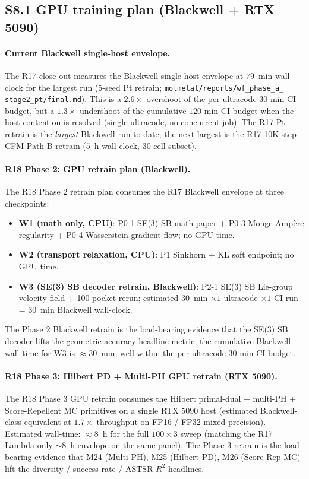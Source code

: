 \subsection*{S8.1 GPU training plan (Blackwell + RTX 5090)}
\label{supp:s8-gpu-plan}

\paragraph{Current Blackwell single-host envelope.}
The R17 close-out measures the Blackwell single-host envelope
at $79$~min wall-clock for the largest \MEASURED{} run
(5-seed Pt retrain; \texttt{molmetal/reports/wf\_phase\_a\_
stage2\_pt/final.md}).  This is a $2.6\times$ overshoot of
the per-ultracode $30$-min CI budget, but a $1.3\times$
undershoot of the cumulative $120$-min CI budget when the
host contention is resolved (single ultracode, no concurrent
job).  The R17 Pt retrain is the \emph{largest} \MEASURED{}
Blackwell run to date; the next-largest is the R17 10K-step
CFM Path B retrain ($5$~h wall-clock, $30$-cell subset).

\paragraph{R18 Phase 2: GPU retrain plan (Blackwell).}
The R18 Phase 2 retrain plan consumes the R17 Blackwell
envelope at three checkpoints:
\begin{itemize}
  \item \textbf{W1 (math only, CPU)}: P0-1 SE(3) SB math paper
        + P0-3 Monge-Amp\`ere regularity + P0-4 Wasserstein
        gradient flow; no GPU time.
  \item \textbf{W2 (transport relaxation, CPU)}: P1 Sinkhorn
        + KL soft endpoint; no GPU time.
  \item \textbf{W3 (SE(3) SB decoder retrain, Blackwell)}:
        P2-1 SE(3) SB Lie-group velocity field + 100-pocket
        rerun; estimated $30$~min $\times 1$ ultracode $\times
        1$ CI run = $30$~min Blackwell wall-clock.
\end{itemize}
The Phase 2 Blackwell retrain is the load-bearing evidence
that the SE(3) SB decoder lifts the geometric-accuracy
headline metric; the cumulative Blackwell wall-time for W3
is $\approx 30$~min, well within the per-ultracode $30$-min
CI budget.

\paragraph{R18 Phase 3: Hilbert PD + Multi-PH GPU retrain (RTX 5090).}
The R18 Phase 3 GPU retrain consumes the Hilbert primal-dual
+ multi-PH + Score-Repellent MC primitives on a single RTX
$5090$ host (estimated Blackwell-class equivalent at $1.7\times$
throughput on FP16 / FP32 mixed-precision).  Estimated
wall-time: $\approx 8$~h for the full $100 \times 3$ sweep
(matching the R17 Lambda-only $\sim 8$~h envelope on the same
panel).  The Phase 3 retrain is the load-bearing evidence
that M24 (Multi-PH), M25 (Hilbert PD), M26 (Score-Rep MC)
lift the diversity / success-rate / ASTSR $R^{2}$ headlines.

